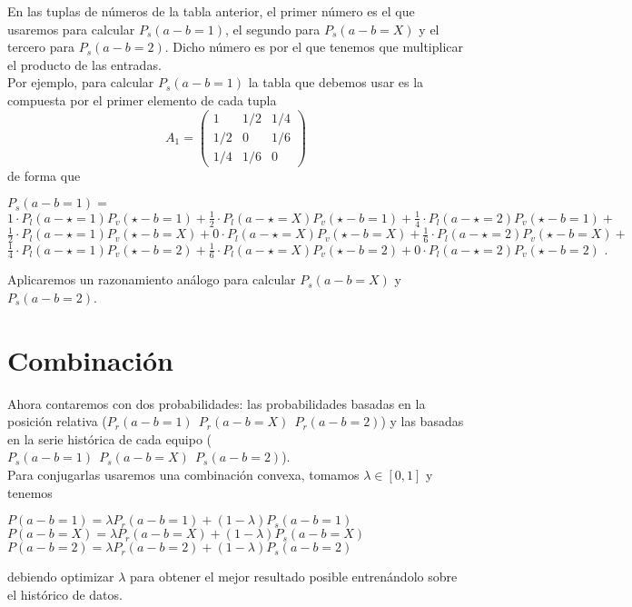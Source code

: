 En las tuplas de números de la tabla anterior, el primer número es el que usaremos para calcular $P_{s}(a-b=1)$, el segundo para $P_{s}(a-b=X)$ y el tercero para $P_{s}(a-b=2)$. Dicho número es por el que tenemos que multiplicar el producto de las entradas.\\

Por ejemplo, para calcular $P_{s}(a-b=1)$ la tabla que debemos usar es la compuesta por el primer elemento de cada tupla\\
\[
A_{1}= \left(\begin{array}{ccc}
1 & 1/2 & 1/4\\
1/2 & 0 & 1/6\\
1/4 & 1/6 & 0
\end{array} \right)
\]
de forma que
\begin{center}
	$P_{s}(a-b=1)=$\\
	$1\cdotp P_{l}(a - \star=1)P_{v}(\star - b=1) + \frac{1}{2}\cdotp P_{l}(a - \star=X)P_{v}(\star - b=1) + \frac{1}{4}\cdotp P_{l}(a - \star=2)P_{v}(\star - b=1)+$\\ 
	$\frac{1}{2}\cdotp P_{l}(a - \star=1)P_{v}(\star - b=X) + 0\cdotp P_{l}(a - \star=X)P_{v}(\star - b=X) + \frac{1}{6}\cdotp P_{l}(a - \star=2)P_{v}(\star - b=X)+$\\
	$\frac{1}{4}\cdotp P_{l}(a - \star=1)P_{v}(\star - b=2) + \frac{1}{6}\cdotp P_{l}(a - \star=X)P_{v}(\star - b=2) + 0\cdotp P_{l}(a - \star=2)P_{v}(\star - b=2)\text{ .} $ 
\end{center}

Aplicaremos un razonamiento análogo para calcular $P_{s}(a-b=X)$ y $P_{s}(a-b=2)$.

\section{Combinación}
Ahora contaremos con dos probabilidades: las probabilidades basadas en la posición relativa ($P_{r}(a-b=1) \ \ P_{r}(a-b=X) \ \ P_{r}(a-b=2)$) y las basadas en la serie histórica de cada equipo ($P_{s}(a-b=1) \ \ P_{s}(a-b=X) \ \ P_{s}(a-b=2)$).\\

Para conjugarlas usaremos una combinación convexa, tomamos $\lambda \in [0,1]$ y tenemos
\begin{center}
	$ P(a-b=1) = \lambda P_{r}(a-b=1) + (1-\lambda) P_{s}(a-b=1)$\\
	$ P(a-b=X) = \lambda P_{r}(a-b=X) + (1-\lambda) P_{s}(a-b=X)$\\
	$ P(a-b=2) = \lambda P_{r}(a-b=2) + (1-\lambda) P_{s}(a-b=2)$
\end{center}
debiendo optimizar $\lambda$ para obtener el mejor resultado posible entrenándolo sobre el histórico de datos.